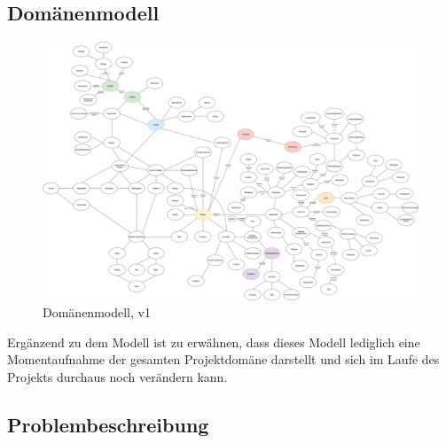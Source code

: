 \documentclass[10pt]{article}
\begin{document}
        \subsection{Domänenmodell}\label{sec:Domaenenmodell}
        \begin{figure}[h] %
            \includegraphics[width=1\textwidth]{../../Domänenmodell/PPSS21_Mai_Domänenmodell.png}
            \caption[Das Domänenmodell]{Domänenmodell, v1}
            \label{fig:domaenenmodell}
        \end{figure}
        Ergänzend zu dem Modell ist zu erwähnen, dass dieses Modell lediglich eine Momentaufnahme der gesamten Projektdomäne darstellt und sich im Laufe des Projekts durchaus noch verändern kann.

        \subsection{Problembeschreibung}\label{sec:Problembeschreibung}
        
\end{document}
